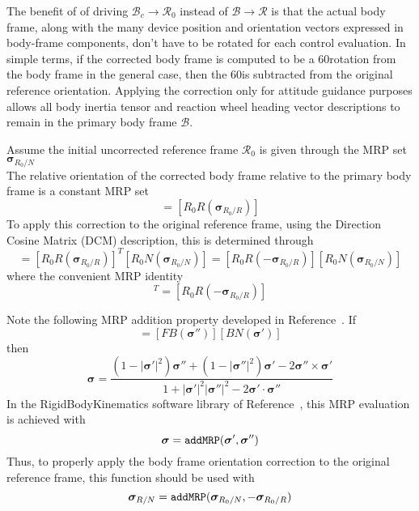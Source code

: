 \documentclass[]{AVSSimReportMemo}
\begin{document}
The benefit of of driving $\mathcal{B}_{c} \rightarrow \mathcal{R}_{0}$ instead of $\mathcal{B}  \rightarrow \mathcal{R}$ is that the actual body frame, along with the many device position and orientation vectors expressed in  body-frame components, don't have to be rotated for each control evaluation.  In simple terms, if the corrected body frame is computed to be a 60\dg rotation from the body frame in the general case, then the 60\dg is subtracted from the original reference orientation. Applying the correction only for attitude guidance purposes allows all body inertia tensor and reaction wheel heading vector descriptions to remain in the primary body frame $\mathcal{B}$.  

Assume the initial uncorrected reference frame $\mathcal{R}_{0}$ is given through the MRP set $\bm\sigma_{R_{0}/N}$
\begin{equation}
	[R_{0}N(	\bm\sigma_{R_{0}/N})]
\end{equation}
The relative orientation of the corrected body frame relative to the primary body frame is a constant MRP set
\begin{equation}
	[B_{c}B(\bm\sigma_{B_{c}/B})] = [R_{0}R(\bm\sigma_{R_{0}/R})]
\end{equation}
To apply this correction to the original reference frame, using the Direction Cosine Matrix (DCM) description, this is determined through
\begin{equation}
	[RN(\bm\sigma_{R/N})] = [R_{0}R(\bm\sigma_{R_{0}/R})]^{T} [R_{0}N(\bm\sigma_{R_{0}/N})] = 
	[R_{0}R(-\bm\sigma_{R_{0}/R})] [R_{0}N(\bm\sigma_{R_{0}/N})]
\end{equation}
where the convenient MRP identity
\begin{equation}
	 [R_{0}R(\bm\sigma_{R_{0}/R})]^{T} = [R_{0}R(-\bm\sigma_{R_{0}/R})] 
\end{equation}

Note the following MRP addition property developed in Reference~.  If
\begin{equation}
	[BN(\bm\sigma)] = [FB(\bm\sigma '')] [ BN(\bm\sigma ')]
\end{equation}
then
\begin{equation}
	\bm\sigma = \frac{
		(1-|\bm\sigma'|^{2})\bm\sigma '' + (1-|\bm\sigma ''|^{2}) \bm\sigma ' - 2 \bm\sigma '' \times \bm\sigma '
	}{
		1 + |\bm\sigma '|^{2} |\bm\sigma''|^{2} - 2 \bm\sigma' \cdot \bm\sigma''
	}
\end{equation}
In the RigidBodyKinematics software library of Reference~, this MRP evaluation is achieved with 
$$
	\bm\sigma = {\tt addMRP}(\bm\sigma ', \bm\sigma'')
$$
Thus, to properly apply the body frame orientation correction to the original reference frame, this function should be used with
$$
	\bm\sigma_{R/N} = {\tt addMRP}(\bm\sigma_{R_{0}/N}, -\bm\sigma_{R_{0}/R})
$$ 



\end{document}
